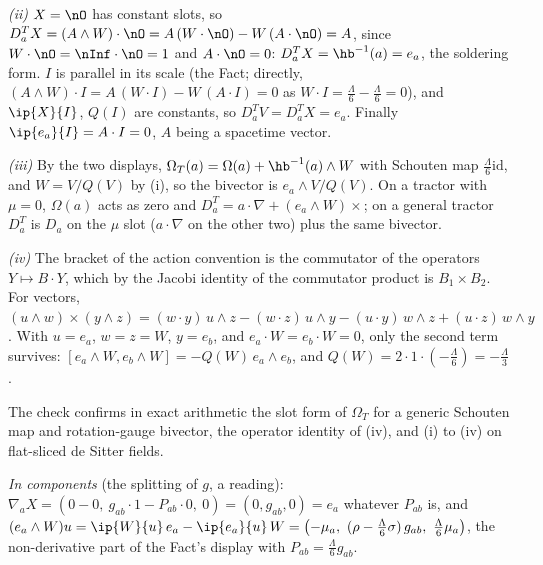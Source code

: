\emph{(ii)} $X = \nO$ has constant slots, so $D^{T}_{a}X = (A \wedge W) \cdot \nO = A\,(W \cdot \nO) - W\,(A \cdot \nO) = A$, since $W \cdot \nO = \nInf \cdot \nO = 1$ and $A \cdot \nO = 0$: $D^{T}_{a}X = \hb^{-1}(a) = e_{a}$, the soldering form. $I$ is parallel in its scale (the Fact; directly, $(A \wedge W) \cdot I = A\,(W \cdot I) - W\,(A \cdot I) = 0$ as $W \cdot I = \tfrac{\Lambda}{6} - \tfrac{\Lambda}{6} = 0$), and $\ip{X}{I}$, $Q(I)$ are constants, so $D^{T}_{a}V = D^{T}_{a}X = e_{a}$. Finally $\ip{e_{a}}{I} = A \cdot I = 0$, $A$ being a spacetime vector.

\emph{(iii)} By the two displays, $\Omega_{T}(a) = \Omega(a) + \hb^{-1}(a) \wedge W$ with Schouten map $\tfrac{\Lambda}{6}\mathrm{id}$, and $W = V/Q(V)$ by (i), so the bivector is $e_{a} \wedge V/Q(V)$. On a tractor with $\mu = 0$, $\Omega(a)$ acts as zero and $D^{T}_{a} = a \cdot \nabla + (e_{a} \wedge W)\times$; on a general tractor $D^{T}_{a}$ is $D_{a}$ on the $\mu$ slot ($a \cdot \nabla$ on the other two) plus the same bivector.

\emph{(iv)} The bracket of the action convention is the commutator of the operators $Y \mapsto B \cdot Y$, which by the Jacobi identity of the commutator product is $B_{1} \times B_{2}$. For vectors, $(u \wedge w) \times (y \wedge z) = (w \cdot y)\,u \wedge z - (w \cdot z)\,u \wedge y - (u \cdot y)\,w \wedge z + (u \cdot z)\,w \wedge y$. With $u = e_{a}$, $w = z = W$, $y = e_{b}$, and $e_{a} \cdot W = e_{b} \cdot W = 0$, only the second term survives: $[e_{a} \wedge W, e_{b} \wedge W] = -Q(W)\,e_{a} \wedge e_{b}$, and $Q(W) = 2\cdot 1\cdot(-\tfrac{\Lambda}{6}) = -\tfrac{\Lambda}{3}$.

The check confirms in exact arithmetic the slot form of $\Omega_{T}$ for a generic Schouten map and rotation-gauge bivector, the operator identity of (iv), and (i) to (iv) on flat-sliced de Sitter fields.

\emph{In components} (the splitting of $g$, a reading): $\nabla_{a}X = (0 - 0,\ g_{ab}\cdot 1 - P_{ab}\cdot 0,\ 0) = (0, g_{ab}, 0) = e_{a}$ whatever $P_{ab}$ is, and $(e_{a}\wedge W)u = \ip{W}{u}\,e_{a} - \ip{e_{a}}{u}\,W = \bigl(-\mu_{a},\ (\rho - \tfrac{\Lambda}{6}\sigma)\,g_{ab},\ \tfrac{\Lambda}{6}\mu_{a}\bigr)$, the non-derivative part of the Fact's display with $P_{ab} = \tfrac{\Lambda}{6}g_{ab}$.
